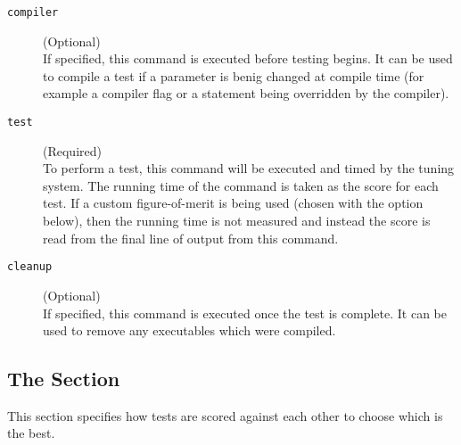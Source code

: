 \documentclass[a4paper, draft]{article}
\begin{document}
\begin{description}

    \item[\texttt{compiler}] (Optional) \\
        If specified, this command is executed before testing begins. 
        It can be used to compile a test if a parameter is benig changed at 
        compile time (for example a compiler flag or a  
        statement being overridden by the compiler).

    \item[\texttt{test}] (Required) \\
        To perform a test, this command will be executed and timed by the 
        tuning system. The running time of the command is taken as the score 
        for each test. If a custom figure-of-merit is being used (chosen with 
        the  option below), then the running time is not 
        measured and instead the score is read from the final line of output 
        from this command.

    \item[\texttt{cleanup}] (Optional) \\
        If specified, this command is executed once the test is complete. 
        It can be used to remove any executables which were compiled.

\end{description}




\subsection{The \confsnippet{[scoring]} Section}
This section specifies how tests are scored against each other to choose 
which is the best.
\end{document}
